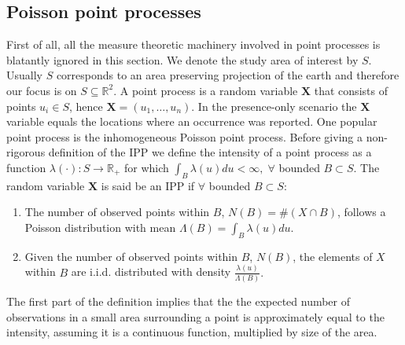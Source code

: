 \subsection{Poisson point processes}
\label{sec:IPP}
First of all, all the measure theoretic machinery involved in point processes is blatantly ignored in this section. We denote the study area of interest by $S$. Usually $S$ corresponds to an area preserving projection of the earth and therefore our focus is on $S\subseteq \mathbb{R}^2$. A point process is a random variable $\bm{X}$ that consists of points $u_i \in S$, hence $\bm{X} =  (u_1,\ldots,u_n)$. In the presence-only scenario the $\bm{X}$ variable equals the locations where an occurrence was reported. One popular point process is the inhomogeneous Poisson point process. Before giving a non-rigorous definition of the IPP we define the intensity of a point process as a function $\lambda(\cdot): S \to \mathbb{R}_+$ for which $\int_B \lambda(u)du < \infty,\; \forall$ bounded $B \subset S$. The random variable $\bm{X}$ is said be an IPP if $\forall$ bounded $ B \subset S$:
\begin{enumerate}
\item The number of observed points within $B$, $N(B) = \# (X \cap B)$, follows a Poisson distribution with mean $\Lambda(B) = \int_B \lambda(u)du.$
\item Given the number of observed points within $B$, $N(B)$, the elements of $X$ within $B$ are i.i.d. distributed with density $\frac{\lambda(u)}{\Lambda(B)}.$
\end{enumerate}
The first part of the definition implies that the the expected number of observations in a small area surrounding a point is approximately equal to the intensity, assuming it is a continuous function, multiplied by size of the area. \\

